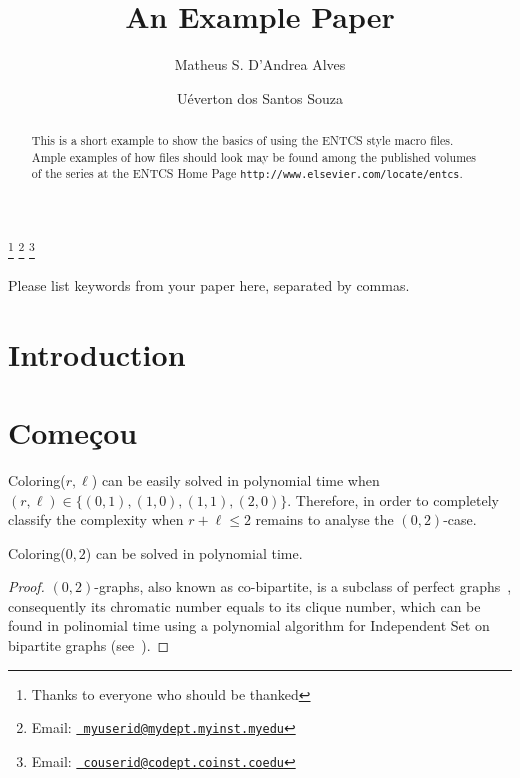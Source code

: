 \documentclass[9pt]{../document-types/entcs} \usepackage{../document-types/entcsmacro}
\newcommand{\?}{\textcolor{warn}{?}}
\begin{document}
\begin{frontmatter}
  \title{An Example Paper} \author{Matheus S. D'Andrea Alves}
  \address{Instituto de Computaç\~ao\\ Universidade Federal Fluminense\\
    Niter\'oi, Brazil} \author{U\'everton dos Santos Souza}
    \address{Instituto de Computaç\~ao\\ Universidade Federal Fluminense\\
      Niter\'oi, Brazil} \thanks[ALL]{Thanks
    to everyone who should be thanked} \thanks[myemail]{Email:
    \href{mailto:myuserid@mydept.myinst.myedu} {\texttt{\normalshape
        myuserid@mydept.myinst.myedu}}} \thanks[coemail]{Email:
    \href{mailto:couserid@codept.coinst.coedu} {\texttt{\normalshape
        couserid@codept.coinst.coedu}}}
\begin{abstract}
  This is a short example to show the basics of using the ENTCS style
  macro files.  Ample examples of how files should look may be found
  among the published volumes of the series at the ENTCS Home Page
  \texttt{http://www.elsevier.com/locate/entcs}.
\end{abstract}
\begin{keyword}
  Please list keywords from your paper here, separated by commas.
\end{keyword}
\end{frontmatter}





\section{Introduction}\label{intro}

\section{Começou}

{\sc Coloring($r,\ell$)} can be easily solved in polynomial time when $(r,\ell) \in \{(0,1),(1,0),(1,1),(2,0)\}$.
Therefore, in order to completely classify the complexity when $r+\ell \leq 2$ remains to analyse the $(0,2)$-case.

	\begin{lemma}
{\sc Coloring($0,2$)} can be solved in polynomial time.
\end{lemma}
	\begin{proof}
$(0,2)$-graphs, also known as co-bipartite, is a subclass of perfect graphs~\cite{bollo98}, consequently its chromatic number
equals to its clique number, which can be found in polinomial time using a polynomial algorithm for {\sc Independent Set}
on bipartite graphs (see~\cite{konig31,zing12}).
	\end{proof}
\end{document}

